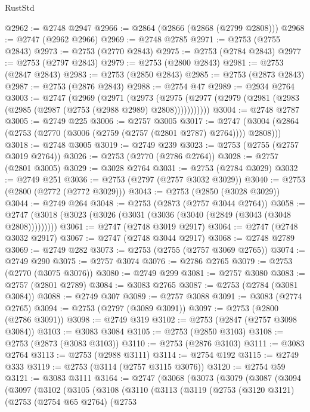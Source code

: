 \begin{lexlean}{RustStd}
\begin{coremodule}
@2962 := @2748 @2947
@2966 := @2864 (@2866 (@2868 (@2799 @2808)))
@2968 := @2747 (@2962 @2966)
@2969 := @2748 @2785
@2971 := @2753 (@2755 @2843)
@2973 := @2753 (@2770 @2843)
@2975 := @2753 (@2784 @2843)
@2977 := @2753 (@2797 @2843)
@2979 := @2753 (@2800 @2843)
@2981 := @2753 (@2847 @2843)
@2983 := @2753 (@2850 @2843)
@2985 := @2753 (@2873 @2843)
@2987 := @2753 (@2876 @2843)
@2988 := @2754 @47
@2989 := @2934 @2764
@3003 := @2747
    (@2969
      (@2971
        (@2973
          (@2975 (@2977 (@2979 (@2981 (@2983 (@2985 (@2987 (@2753 (@2988 @2989) @2808)))))))))))
@3004 := @2748 @2787
@3005 := @2749 @225
@3006 := @2757 @3005
@3017 := @2747 (@3004 (@2864 (@2753 (@2770 (@3006 (@2759 (@2757 (@2801 @2787) @2764)))) @2808)))
@3018 := @2748 @3005
@3019 := @2749 @239
@3023 := @2753 (@2755 (@2757 @3019 @2764))
@3026 := @2753 (@2770 (@2786 @2764))
@3028 := @2757 (@2801 @3005)
@3029 := @3028 @2764
@3031 := @2753 (@2784 @3029)
@3032 := @2749 @251
@3036 := @2753 (@2797 (@2757 @3032 @3029))
@3040 := @2753 (@2800 (@2772 (@2772 @3029)))
@3043 := @2753 (@2850 (@3028 @3029))
@3044 := @2749 @264
@3048 := @2753 (@2873 (@2757 @3044 @2764))
@3058 := @2747 (@3018 (@3023 (@3026 (@3031 (@3036 (@3040 (@2849 (@3043 (@3048 @2808)))))))))
@3061 := @2747 (@2748 @3019 @2917)
@3064 := @2747 (@2748 @3032 @2917)
@3067 := @2747 (@2748 @3044 @2917)
@3068 := @2748 @2789
@3069 := @2749 @282
@3073 := @2753 (@2755 (@2757 @3069 @2765))
@3074 := @2749 @290
@3075 := @2757 @3074
@3076 := @2786 @2765
@3079 := @2753 (@2770 (@3075 @3076))
@3080 := @2749 @299
@3081 := @2757 @3080
@3083 := @2757 (@2801 @2789)
@3084 := @3083 @2765
@3087 := @2753 (@2784 (@3081 @3084))
@3088 := @2749 @307
@3089 := @2757 @3088
@3091 := @3083 (@2774 @2765)
@3094 := @2753 (@2797 (@3089 @3091))
@3097 := @2753 (@2800 (@2786 @3091))
@3098 := @2749 @319
@3102 := @2753 (@2847 (@2757 @3098 @3084))
@3103 := @3083 @3084
@3105 := @2753 (@2850 @3103)
@3108 := @2753 (@2873 (@3083 @3103))
@3110 := @2753 (@2876 @3103)
@3111 := @3083 @2764
@3113 := @2753 (@2988 @3111)
@3114 := @2754 @192
@3115 := @2749 @333
@3119 := @2753 (@3114 (@2757 @3115 @3076))
@3120 := @2754 @59
@3121 := @3083 @3111
@3164 := @2747
    (@3068
      (@3073
        (@3079
          (@3087
            (@3094
              (@3097
                (@3102
                  (@3105
                    (@3108
                      (@3110
                        (@3113
                          (@3119
                            (@2753
                              (@3120 @3121)
                              (@2753
                                (@2754 @65 @2764)
                                (@2753

\end{coremodule}
\end{lexlean}
